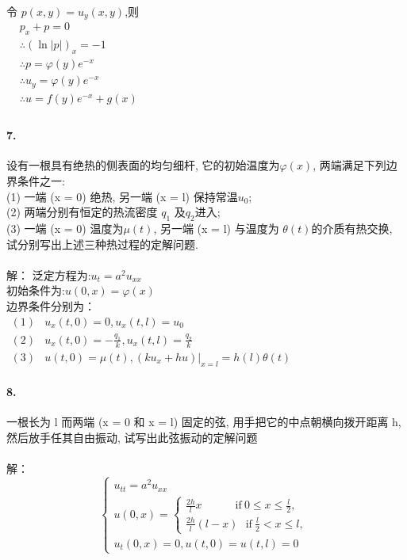 \documentclass{article}
\begin{document}
   令 $ p(x,y) = {u_y}(x,y)$,则	\\
	
	$\begin{aligned}
	 &{p_x} + p = 0\\
     &\therefore {(\ln|p|)_x} =  - 1\\
     &\therefore p = \varphi (y){e^{ - x}}\\
     &\therefore {u_y} = \varphi (y){e^{ - x}}\\
     &\therefore	 u = f(y){e^{ - x}} + g(x) \\
     \end{aligned}$

	\paragraph{7.}
	{\large 设有一根具有绝热的侧表面的均匀细杆, 它的初始温度为$ \varphi(x) $, 两端满足下列边界条件之一:\\
		(1)	一端 (x = 0) 绝热, 另一端 (x = l) 保持常温$ u_0 $; \\
		(2)	两端分别有恒定的热流密度 $ q_1  $ 及$  q_2  $进入;\\
		(3)	一端 (x = 0) 温度为$  \mu(t) $, 另一端 (x = l) 与温度为 $ \theta(t)  $的介质有热交换,\\
		试分别写出上述三种热过程的定解问题.\\
	}
~\\
     \setlength{\parindent}{0em}
     解：\large
     泛定方程为:$ 	{u_t} = {a^2}{u_{xx}} $\\
     \setlength{\parindent}{2em}
     初始条件为:$ 	u(0,x) = \varphi (x) $\\
     边界条件分别为：\\

	$	\begin{aligned}
     (1)&{u_x}(t,0) = 0,{u_x}(t,l) = {u_0}\\
     (2)&{u_x}(t,0) =  - \frac{{{q_1}}}{k},{u_x}(t,l) = \frac{{{q_2}}}{k}\\
     (3)&u(t,0) = \mu (t),(k{u_x} + hu){|_{x = l}} = h(l)\theta (t)
	\end{aligned}$
~\\
   \paragraph{8.}
   {\large 一根长为 l 而两端 (x = 0 和 x = l) 固定的弦, 用手把它的中点朝横向拨开距离 h, 然后放手任其自由振动, 试写出此弦振动的定解问题\\	
   }
~\\
   \setlength{\parindent}{0em}
	解：
    \large
    \[
     \left\{ \begin{array}{l}
     {u_{tt}} = {a^2}{u_{xx}}\\
      u(0,x) = \left\{ {\begin{array}{*{20}{l}}
  	        {\frac{{2h}}{l}x{{\qquad\quad}\text{if}}\ 0 \le x \le \frac{l}{2},}\\
	        {\frac{{2h}}{l}(l - x) \ \ \ \text{if}\ \frac{l}{2} < x \le l,}
         	\end{array}} \right.\\
      {u_t}(0,x) = 0,u(t,0) = u(t,l) = 0
      \end{array}\right.
     \]
\end{document}
